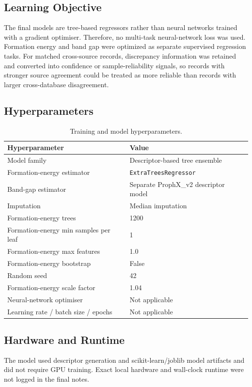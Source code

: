 \documentclass[10pt, a4paper]{article}
\begin{document}
\subsection{Learning Objective}
The final models are tree-based regressors rather than neural networks trained with a gradient optimiser. Therefore, no multi-task neural-network loss was used. Formation energy and band gap were optimized as separate supervised regression tasks. For matched cross-source records, discrepancy information was retained and converted into confidence or sample-reliability signals, so records with stronger source agreement could be treated as more reliable than records with larger cross-database disagreement.

\subsection{Hyperparameters}
\begin{table}[h!]
\centering
\caption{Training and model hyperparameters.}
\label{tab:hparams}
\begin{tabular}{@{}ll@{}}
\toprule
Hyperparameter & Value \\
\midrule
Model family & Descriptor-based tree ensemble \\
Formation-energy estimator & \texttt{ExtraTreesRegressor} \\
Band-gap estimator & Separate ProphX\_v2 descriptor model \\
Imputation & Median imputation \\
Formation-energy trees & 1200 \\
Formation-energy min samples per leaf & 1 \\
Formation-energy max features & 1.0 \\
Formation-energy bootstrap & False \\
Random seed & 42 \\
Formation-energy scale factor & 1.04 \\
Neural-network optimiser & Not applicable \\
Learning rate / batch size / epochs & Not applicable \\
\bottomrule
\end{tabular}
\end{table}

\subsection{Hardware and Runtime}
The model used descriptor generation and scikit-learn/joblib model artifacts and did not require GPU training. Exact local hardware and wall-clock runtime were not logged in the final notes.
\end{document}
